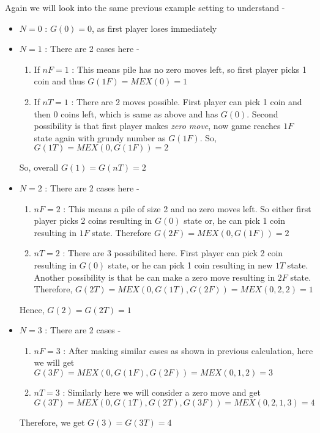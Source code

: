 \documentclass[11pt]{article}
\begin{document}
\begin{example}
    Again we will look into the same previous example setting to understand -
    \begin{itemize}
        \item $N = 0$ : $G(0) = 0$, as first player loses immediately
        \item $N = 1$ : There are 2 cases here -
        \begin{enumerate}
            \item If $nF = 1$ : This means pile has no zero moves left, so first player picks 1 coin and thus $G(1F) = MEX({0}) = 1$
            \item If $nT = 1$ : There are 2 moves possible. First player can pick 1 coin and then 0 coins left, which is same as above and has $G(0)$. Second possibility is that first player makes \textit{zero move}, now game reaches $1F$ state again with grundy number as $G(1F)$. So, $G(1T) = MEX({0, G(1F)}) = 2$
        \end{enumerate}
        So, overall $G(1) = G(nT) = 2$
        \item $N = 2$ : There are 2 cases here -
        \begin{enumerate}
            \item $nF = 2$ : This means a pile of size 2 and no zero moves left. So either first player picks 2 coins resulting in $G(0)$ state or, he can pick 1 coin resulting in $1F$ state. Therefore $G(2F) = MEX({0, G(1F)}) = 2$
            \item $nT = 2$ : There are 3 possibilited here. First player can pick 2 coin resulting in $G(0)$ state, or he can pick 1 coin resulting in new $1T$ state. Another possibility is that he can make a zero move resulting in $2F$ state. Therefore, $G(2T) = MEX({0, G(1T), G(2F)}) = MEX({0,2,2}) = 1$
        \end{enumerate}
        Hence, $G(2) = G(2T) = 1$
        \item $N = 3$ : There are 2 cases -
        \begin{enumerate}
            \item $nF = 3$ : After making similar cases as shown in previous calculation, here we will get $G(3F) = MEX({0, G(1F), G(2F)}) = MEX({0,1,2}) = 3$
            \item $nT = 3$ : Similarly here we will consider a zero move and get $G(3T) = MEX({0, G(1T), G(2T), G(3F)}) = MEX({0,2,1,3}) = 4$
        \end{enumerate}
        Therefore, we get $G(3) = G(3T) = 4$
    \end{itemize}
\end{example}
\end{document}
